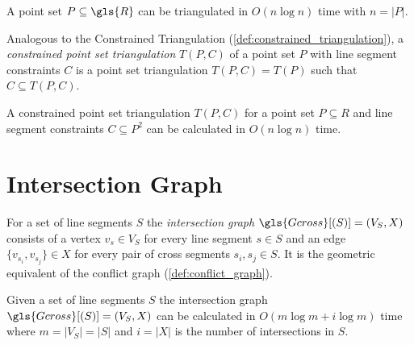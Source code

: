 
\begin{theorem}
  A point set \(P \subseteq \gls{R}\) can be triangulated
  in \(O(n \log n)\) time with \(n = |P|\).
  \cite[Theorem 9.12]{deberg_compgeom}
\end{theorem}


\begin{definition}
  \label{def:constrained_point_set_triangulation}
  Analogous to the Constrained Triangulation
  (\cref{def:constrained_triangulation}), a 
  \emph{constrained point set triangulation} \(T(P,C)\) of a point
  set \(P\) with line segment constraints \(C\) is a point set
  triangulation \(T(P,C) = T(P)\) such that \(C \subseteq T(P, C)\).
\end{definition}


\begin{theorem}
  A constrained point set triangulation \(T(P, C)\) for a point set
  \(P \subseteq R\) and line segment constraints \(C \subseteq P^2\)
  can be calculated in \(O(n \log n)\) time.
  \cite{constrained_triangulation}
\end{theorem}

\section{Intersection Graph}
\label{sec:intersection_graph}

\begin{definition}
  \label{def:intersection_graph}
  For a set of line segments \(S\) the \emph{intersection graph}
  \(\gls{Gcross}[(S)] = (V_S,X)\) consists of a vertex \(v_s \in V_S\)
  for every line segment \(s \in S\) and an edge
  \(\{v_{s_i}, v_{s_j}\} \in X\) for every pair of \gls{cross}
  segments \(s_i, s_j \in S\). It is the geometric equivalent of the
  conflict graph (\cref{def:conflict_graph}).
\end{definition}


\begin{theorem}
  \label{thm:sweep_bound}
  Given a set of line segments \(S\) the intersection graph
  \(\gls{Gcross}[(S)] = (V_S,X)\) can be calculated in
  \(O(m \log m + i \log m)\) time where \(m = |V_S| = |S|\) 
  and \(i = |X|\) is the number of intersections in \(S\).
  \cite[Lemma 2.3]{deberg_compgeom}
\end{theorem}

